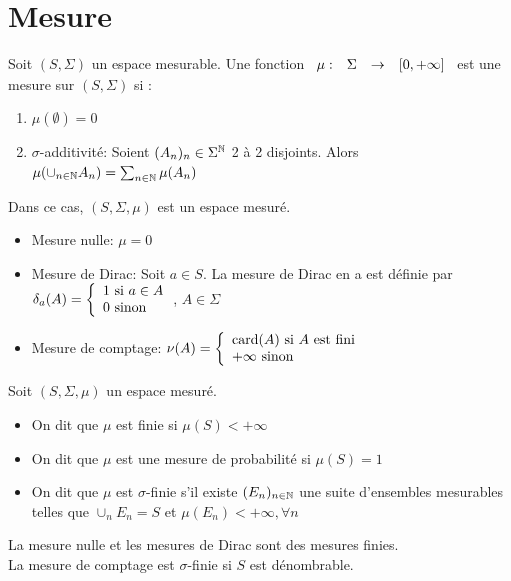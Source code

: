 \documentclass[]{report}
\begin{document}
    \section{Mesure}

    \begin{df}{}{}
        Soit $(S,\Sigma)$ un espace mesurable. Une fonction $\begin{array}{ccccc} \mu : & \Sigma & \to & [0,+\infty] \end{array}$ est une mesure sur $(S,\Sigma)$ si :
        \begin{enumerate}
            \item $\mu(\emptyset)=0$
            \item $\sigma$-additivité: Soient $(A_n)_n\in\Sigma^{\mathbb{N}}$ 2 à 2 disjoints. Alors $\mu(\cup_{n\in\mathbb{N}}A_n)=\sum_{n\in\mathbb{N}}\mu(A_n)$
        \end{enumerate}
        Dans ce cas, $(S,\Sigma,\mu)$ est un espace mesuré.
    \end{df}

    \begin{ex}{}{}
        \begin{itemize}
            \item Mesure nulle: $\mu=0$
            \item Mesure de Dirac: Soit $a\in S$. La mesure de Dirac en a est définie par $\delta_a(A)=\left\{\begin{array}{ll} 1 \text{ si }a\in A\\ 0\text{ sinon} \end{array} \right.$, $A\in\Sigma$
            \item Mesure de comptage: $\nu(A)=\left\{\begin{array}{ll} \text{card}(A)\text{ si $A$ est fini}\\+\infty\text{ sinon} \end{array} \right.$
        \end{itemize}
    \end{ex}

    \begin{df}{}{}
        Soit $(S,\Sigma,\mu)$ un espace mesuré.
        \begin{itemize}
            \item On dit que $\mu$ est finie si $\mu(S)<+\infty$
            \item On dit que $\mu$ est une mesure de probabilité si $\mu(S)=1$
            \item On dit que $\mu$ est $\sigma$-finie s'il existe $(E_n)_{n\in\mathbb{N}}$ une suite d'ensembles mesurables telles que $\cup_{n}E_n=S$ et $\mu(E_n)<+\infty,\forall n$
        \end{itemize}
    \end{df}

    \begin{re}{}{}
        La mesure nulle et les mesures de Dirac sont des mesures finies.\\
        La mesure de comptage est $\sigma$-finie si $S$ est dénombrable.
    \end{re}
\end{document}

